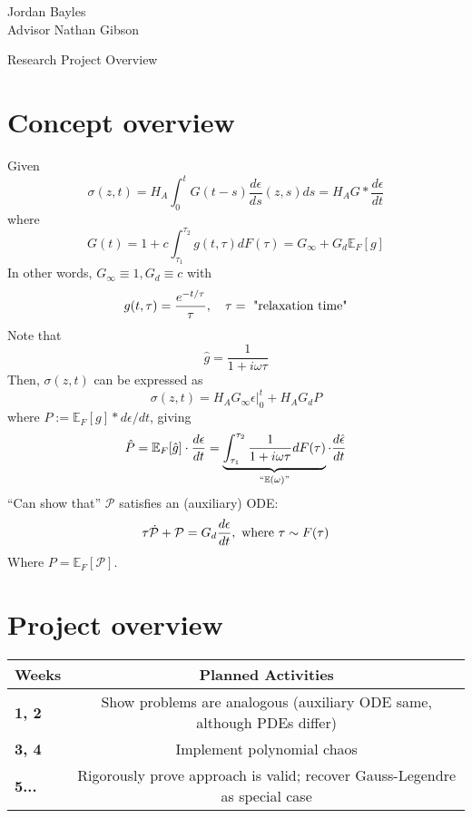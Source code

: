 \documentclass[12pt,letterpaper]{article}
\author{Jordan Bayles}
\newcommand{\field}[1]{\mathbb{#1}} %
\begin{document}
\begin{flushright}
Jordan Bayles\\
Advisor Nathan Gibson
\end{flushright}

\begin{center}
Research Project Overview
\end{center}

\section{Concept overview}
\noindent Given
\[ \sigma (z, t) = H_A \int_0^t G(t-s) \frac{d\epsilon}{ds} (z,s) ds = H_A G * \frac{d\epsilon}{dt} \]
where
\[ G(t) = 1 + c \int_{\tau_1}^{\tau_2} g(t, \tau) dF( \tau ) = G_{\infty} + G_d \field{E}_F [g] \]
In other words, $G_{\infty} \equiv 1, G_d \equiv c$ with
\[ g (t, \tau) = \frac{ e^{-t/\tau}}{\tau}, \quad \tau = \textnormal{ "relaxation time"}\]
Note that
\[ \hat{g} = \frac{1}{ 1 + i\omega\tau} \]
Then, $\sigma(z,t)$ can be expressed as
\[ \sigma(z, t) = H_A G_{\infty} \left. \epsilon \right|_0^t + H_A G_d P \]
where $P := \field{E}_F [g] * d\epsilon/dt$, giving
\[ \hat{P} = \field{E}_F [ \hat{g} ] \cdot \frac{d\epsilon}{dt} = \underbrace{\int_{\tau_1}^{\tau_2} \frac{1}{1 + i\omega\tau} d F(\tau)}_{``\field{E}(\omega)"} \cdot \frac{d\hat{\epsilon}}{dt} \]
``Can show that'' $\mathcal{P}$ satisfies an (auxiliary) ODE:
\[ \tau \dot{\mathcal{P}} + \mathcal{P} = G_d \frac{d\epsilon}{dt},\textnormal{ where } \tau \sim F(\tau) \]
Where $P = \field{E}_F [ \mathcal{P} ]$.

\section{Project overview}
\begin{table}[H]
\begin{tabular}{>{\bfseries}l c}\toprule
Weeks & Planned Activities\\\midrule
1, 2 & Show problems are analogous (auxiliary ODE same, although PDEs differ)\\
3, 4 & Implement polynomial chaos \\
5... & Rigorously prove approach is valid; recover Gauss-Legendre as special case
\\\bottomrule
\end{tabular}
\end{table}
\end{document}
